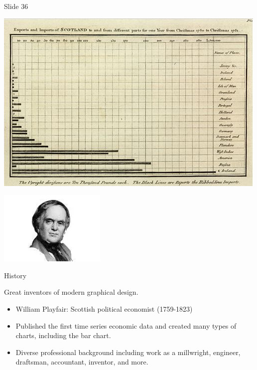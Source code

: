 \documentclass[
  ignorenonframetext,
]{beamer}
\begin{document}
\begin{frame}{Slide 36}
\protect\hypertarget{slide-36}{}
\begin{minipage}{0.45\textwidth}
\centering
\includegraphics[width=\textwidth]{excellence_figs/fig_33.png}
\end{minipage}
\hfill
\begin{minipage}{0.45\textwidth}
\centering
\includegraphics[width=\textwidth]{excellence_figs/fig_32.png}
\end{minipage}
\hfill
\begin{minipage}{0.45\textwidth}
\footnotesize
History

Great inventors of modern graphical design.

\begin{itemize}
  \item William Playfair: Scottish political economist (1759-1823)
  \item Published the first time series economic data and created many types of charts, including the bar chart.
  \item Diverse professional background including work as a millwright, engineer, draftsman, accountant, inventor, and more.
\end{itemize}
\end{minipage}
\end{frame}
\end{document}
